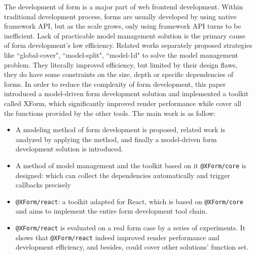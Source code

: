 \documentclass[winfonts,master,twoside]{njuthesis}
\makeatletter
\newcommand{\xform}[1]{\texttt{@XForm/#1}}
\makeatother
\begin{document}
\begin{englishabstract}

    The development of form is a major part of web frontend development. Within traditional development process, forms are usually developed by using native framework API, but as the scale grows, only using framework API turns to be inefficient. Lack of practicable model management solution is the primary cause of form development's low efficiency. Related works separately proposed strategies like ``global-cover", ``model-split", ``model-1d" to solve the model management problem. They literally improved efficiency, but limited by their design flaws, they do have some constraints on the size, depth or specific dependencies of forms. In order to reduce the complexity of form development, this paper introduced a model-driven form development solution and implemented a toolkit called XForm, which significantly improved render performance while cover all the functions provided by the other tools. The main work is as follow:

    \begin{itemize}
        \item A modeling method of form development is proposed, related work is analyzed by applying the method, and finally a model-driven form development solution is introduced.
        \item A method of model management and the toolkit based on it \xform{core} is designed: which can collect the dependencies automatically and trigger callbacks precisely
        \item \xform{react}: a toolkit adapted for React, which is based on \xform{core} and aims to implement the entire form development tool chain.
        \item \xform{react} is evaluated on a real form case by a series of experiments. It shows that \xform{react} indeed improved render performance and development efficiency, and besides, could cover other solutions' function set.
    \end{itemize}


\end{englishabstract}

\tableofcontents
\end{document}
